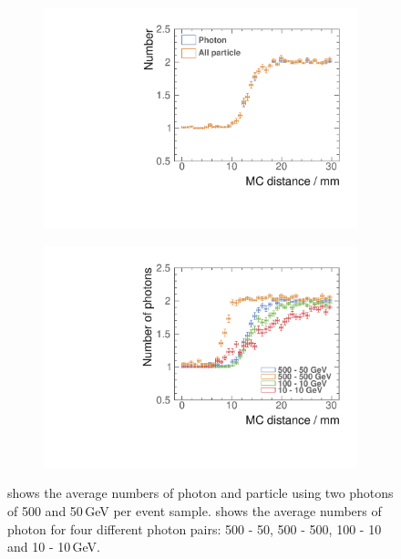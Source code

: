 \begin{figure}[tbph]
\centering
    \begin{subfigure}[b]{0.45\textwidth}
        \includegraphics[width=\textwidth]{photon/DoubleN_pN_all.pdf}
        \caption{}
        \label{fig:photonDoubleCompareN_pN_all}
    \end{subfigure}
    \begin{subfigure}[b]{0.45\textwidth}
        \includegraphics[width=\textwidth]{photon/DoubleCompareEnergies.pdf}
        \caption{}
        \label{fig:photonDoubleCompareEnergies}
    \end{subfigure}
\caption[Average numbers of photon and particle using two photons of 500 and 50\,GeV per event sample and with different energy pairs.]
{ shows the average numbers of photon and particle using two photons of 500 and 50\,GeV per event sample.  shows the  average numbers of photon for four different photon pairs: 500 - 50, 500 - 500, 100 - 10 and 10 - 10\,GeV.}
\label{fig:photonDoublePerformance}
\end{figure}

